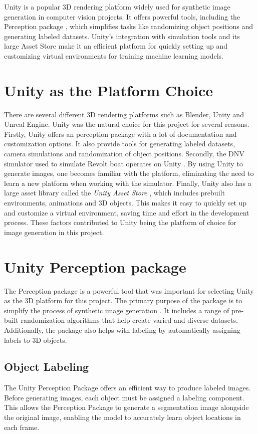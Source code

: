 Unity is a popular 3D rendering platform widely used for synthetic image generation in computer vision projects. It offers powerful tools, including the Perception package \cite{unity-perception2022}, which simplifies tasks like randomizing object positions and generating labeled datasets. Unity's integration with simulation tools and its large Asset Store \cite{UnityAssetStore} make it an efficient platform for quickly setting up and customizing virtual environments for training machine learning models.

\section{Unity as the Platform Choice}
There are several different 3D rendering platforms such as Blender, Unity and Unreal Engine. Unity was the natural choice for this project for several reasons. Firstly, Unity offers an perception package \cite{unity-perception2022} with a lot of documentation and customization options. It also provide tools for generating labeled datasets, camera simulations and randomization of object positions. Secondly, the DNV simulator used to simulate Revolt boat operates on Unity \cite{dnv_wiki}. By using Unity to generate images, one becomes familiar with the platform, eliminating the need to learn a new platform when working with the simulator. Finally, Unity also has a large asset library called the \textit{Unity Asset Store} \cite{UnityAssetStore}, which includes prebuilt environments, animations and 3D objects. This makes it easy to quickly set up and customize a virtual environment, saving time and effort in the development process. These factors contributed to Unity being the platform of choice for image generation in this project.


\section{Unity Perception package}
The Perception package is a powerful tool that was important for selecting Unity as the 3D platform for this project. The primary purpose of the package is to simplify the process of synthetic image generation \cite{borkman2021unityperceptiongeneratesynthetic}. It includes a range of pre-built randomization algorithms that help create varied and diverse datasets. Additionally, the package also helps with labeling by automatically assigning labels to 3D objects.

\subsection{Object Labeling}
The Unity Perception Package offers an efficient way to produce labeled images. Before generating images, each object must be assigned a labeling component. This allows the Perception Package to generate a segmentation image alongside the original image, enabling the model to accurately learn object locations in each frame.



